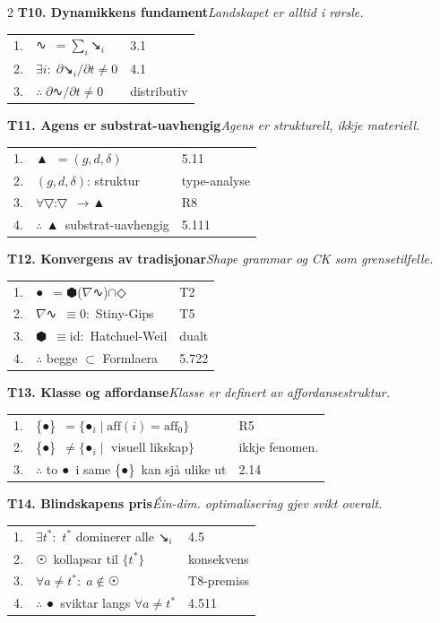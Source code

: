 \documentclass[a4paper,10pt]{article}
\makeatletter
\newcommand{\g}[1]{{\symbolfont #1}}
\newcommand{\gAgent}{\g{▲}}
\newcommand{\gForm}{\g{●}}
\newcommand{\gGrammatikk}{\g{⬢}}
\newcommand{\gKlasse}{\g{\{●\}}}
\newcommand{\gLyskjegle}{\g{◇}}
\newcommand{\gOmhug}{\g{☉}}
\newcommand{\gTrykk}{\g{↘}}
\newcommand{\gSubstrat}{\g{▽}}
\newcommand{\gLandskap}{\g{∿}}
\newcommand{\bv}[3]{%
\vspace{0.4em}%
\noindent\textbf{#1}\hspace{0.4em}\emph{\footnotesize #2}\\[0.15em]
\begin{tabular}{@{}r@{\hspace{0.3em}}l@{\hspace{0.8em}}l@{}}
#3
\end{tabular}%
}
\makeatother
\begin{document}
\begin{multicols}{2}
\bv{T10. Dynamikkens fundament}{Landskapet er alltid i r\o{}rsle.}{%
1. & \gLandskap\ $=\sum_i$\gTrykk$_i$                                          & 3.1\\
2. & $\exists i:\;\partial$\gTrykk$_i/\partial t\neq 0$                        & 4.1\\
3. & $\therefore\;\partial$\gLandskap$/\partial t\neq 0$                       & distributiv\\
}

\bv{T11. Agens er substrat-uavhengig}{Agens er strukturell, ikkje materiell.}{%
1. & \gAgent\ $=(g,d,\delta)$                                                  & 5.11\\
2. & $(g,d,\delta)$: struktur                                                  & type-analyse\\
3. & $\forall$\gSubstrat:\gSubstrat\ $\rightarrow$\gAgent                      & R8\\
4. & $\therefore$ \gAgent\ substrat-uavhengig                                  & 5.111\\
}

\bv{T12. Konvergens av tradisjonar}{Shape grammar og CK som grensetilfelle.}{%
1. & \gForm\ $=$\gGrammatikk($\nabla$\gLandskap)$\cap$\gLyskjegle               & T2\\
2. & $\nabla$\gLandskap\ $\equiv 0:$ Stiny-Gips                                & T5\\
3. & \gGrammatikk\ $\equiv$id$:$ Hatchuel-Weil                                 & dualt\\
4. & $\therefore$ begge $\subset$ Formlaera                                    & 5.722\\
}

\bv{T13. Klasse og affordanse}{Klasse er definert av affordansestruktur.}{%
1. & \gKlasse\ $=\{$\gForm$_i\mid\mathrm{aff}(i){=}\mathrm{aff}_0\}$           & R5\\
2. & \gKlasse\ $\neq\{$\gForm$_i\mid$ visuell likskap$\}$                      & ikkje fenomen.\\
3. & $\therefore$ to \gForm\ i same \gKlasse\ kan sj\aa{} ulike ut            & 2.14\\
}

\bv{T14. Blindskapens pris}{\'Ein-dim. optimalisering gjev svikt overalt.}{%
1. & $\exists t^*:$ $t^*$ dominerer alle \gTrykk$_i$                           & 4.5\\
2. & \gOmhug\ kollapsar til $\{t^*\}$                                          & konsekvens\\
3. & $\forall a\neq t^*:\;a\notin$\gOmhug                                      & T8-premiss\\
4. & $\therefore$ \gForm\ sviktar langs $\forall a\neq t^*$                    & 4.511\\
}


\end{multicols}
\end{document}
